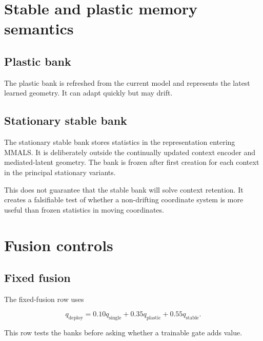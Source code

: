 \documentclass[11pt,a4paper]{article}
\begin{document}




\section{Stable and plastic memory semantics}

\subsection{Plastic bank}

The plastic bank is refreshed from the current model and represents the latest learned geometry. It can adapt quickly but may drift.

\subsection{Stationary stable bank}

The stationary stable bank stores statistics in the representation entering MMALS. It is deliberately outside the continually updated context encoder and mediated-latent geometry. The bank is frozen after first creation for each context in the principal stationary variants.

This does not guarantee that the stable bank will solve context retention. It creates a falsifiable test of whether a non-drifting coordinate system is more useful than frozen statistics in moving coordinates.

\section{Fusion controls}

\subsection{Fixed fusion}

The fixed-fusion row uses

\begin{equation}
q_{\mathrm{deploy}}=0.10q_{\mathrm{single}}+0.35q_{\mathrm{plastic}}+0.55q_{\mathrm{stable}}.
\end{equation}

This row tests the banks before asking whether a trainable gate adds value.
\end{document}
